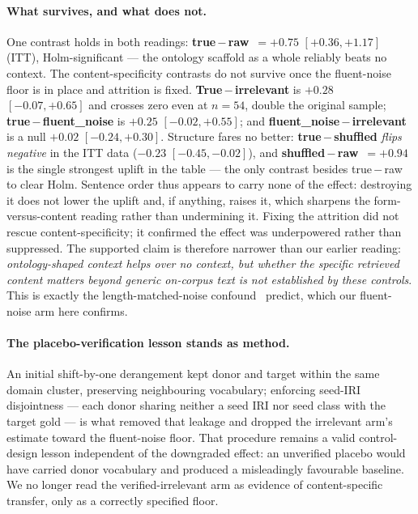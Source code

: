 \documentclass[10pt,twocolumn]{article}
\begin{document}
\paragraph{What survives, and what does not.} One contrast holds in both readings: \textbf{true\,$-$\,raw}~$=+0.75$ $[+0.36,+1.17]$ (ITT), Holm-significant --- the ontology scaffold as a whole reliably beats no context. The content-specificity contrasts do not survive once the fluent-noise floor is in place and attrition is fixed. \textbf{True\,$-$\,irrelevant} is $+0.28$ $[-0.07,+0.65]$ and crosses zero even at $n=54$, double the original sample; \textbf{true\,$-$\,fluent\_noise} is $+0.25$ $[-0.02,+0.55]$; and \textbf{fluent\_noise\,$-$\,irrelevant} is a null $+0.02$ $[-0.24,+0.30]$. Structure fares no better: \textbf{true\,$-$\,shuffled} \emph{flips negative} in the ITT data ($-0.23$ $[-0.45,-0.02]$), and \textbf{shuffled\,$-$\,raw}~$=+0.94$ is the single strongest uplift in the table --- the only contrast besides true\,$-$\,raw to clear Holm. Sentence order thus appears to carry none of the effect: destroying it does not lower the uplift and, if anything, raises it, which sharpens the form-versus-content reading rather than undermining it. Fixing the attrition did not rescue content-specificity; it confirmed the effect was underpowered rather than suppressed. The supported claim is therefore narrower than our earlier reading: \emph{ontology-shaped context helps over no context, but whether the specific retrieved content matters beyond generic on-corpus text is not established by these controls}. This is exactly the length-matched-noise confound~\textcite{cuconasu2024poweofnoise} predict, which our fluent-noise arm here confirms.

\paragraph{The placebo-verification lesson stands as method.} An initial shift-by-one derangement kept donor and target within the same domain cluster, preserving neighbouring vocabulary; enforcing seed-IRI disjointness --- each donor sharing neither a seed IRI nor seed class with the target gold --- is what removed that leakage and dropped the irrelevant arm's estimate toward the fluent-noise floor. That procedure remains a valid control-design lesson independent of the downgraded effect: an unverified placebo would have carried donor vocabulary and produced a misleadingly favourable baseline. We no longer read the verified-irrelevant arm as evidence of content-specific transfer, only as a correctly specified floor.
\end{document}
